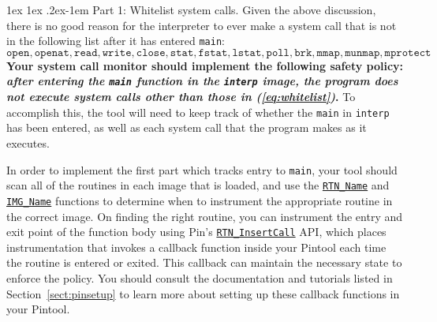 \documentclass[11pt]{article}
\makeatletter
\renewcommand{\paragraph}{%
  \@startsection{paragraph}{4}%
  {\z@}{1ex \@plus 1ex \@minus .2ex}{-1em}%
  {\normalfont\normalsize\bfseries}
}
\makeatother
\begin{document}
\paragraph{Part 1: Whitelist system calls.} Given the above discussion, there is no good reason for the interpreter to ever make a system call that is not in the following list after it has entered \verb'main':
\begin{equation}
\label{eq:whitelist}
\mathtt{open,openat,read,write,close,stat,fstat,lstat,poll,brk,mmap,munmap,mprotect}
\end{equation}
\textbf{Your system call monitor should implement the following safety policy: \emph{after entering the \texttt{main} function in the \texttt{interp} image, the program does not execute system calls other than those in (\ref{eq:whitelist})}.} To accomplish this, the tool will need to keep track of whether the \verb'main' in \verb'interp' has been entered, as well as each system call that the program makes as it executes.

In order to implement the first part which tracks entry to \verb'main', your tool should scan all of the routines in each image that is loaded, and use the \href{https://software.intel.com/sites/landingpage/pintool/docs/81205/Pin/html/group__RTN__BASIC__API.html#gb274bf5dadf6f1ae3259715ae161ebd1}{\texttt{RTN\_Name}} and \href{https://software.intel.com/sites/landingpage/pintool/docs/97438/Pin/html/group__IMG__BASIC__API.html#g491b26d161526b35498839f5cdf30a76}{\texttt{IMG\_Name}} functions to determine when to instrument the appropriate routine in the correct image. On finding the right routine, you can instrument the entry and exit point of the function body using Pin's \href{https://software.intel.com/sites/landingpage/pintool/docs/81205/Pin/html/group__RTN__BASIC__API.html#g006ef964b9e6e4d8e7880231e216344a}{\texttt{RTN\_InsertCall}} API, which places instrumentation that invokes a callback function inside your Pintool each time the routine is entered or exited. This callback can maintain the necessary state to enforce the policy. You should consult the documentation and tutorials listed in Section~\ref{sect:pinsetup} to learn more about setting up these callback functions in your Pintool.
\end{document}
